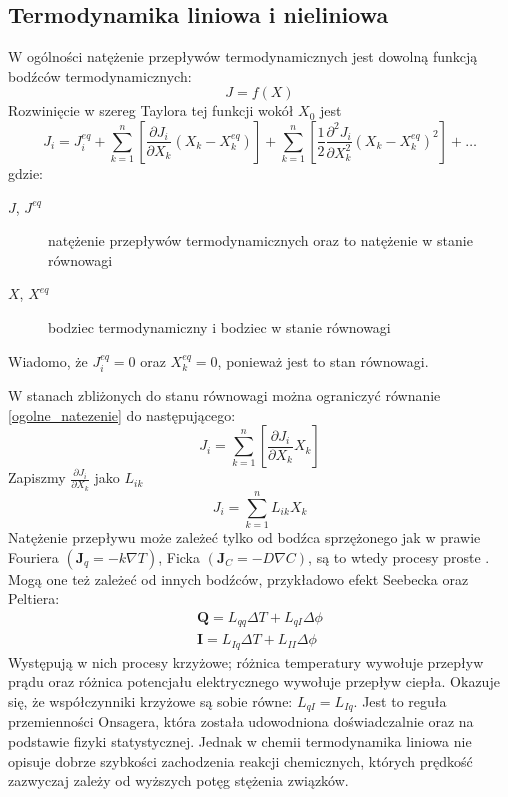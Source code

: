 \documentclass[10pt, a4paper, twoside, onecolumn]{article}
\numberwithin{equation}{section}
\begin{document}
	\subsection{Termodynamika liniowa i nieliniowa}
	W ogólności natężenie przepływów termodynamicznych jest dowolną funkcją bodźców termodynamicznych: 
	\[J=f\left(X\right)\]
	Rozwinięcie w szereg Taylora tej funkcji wokół \(X_{0}\) jest
	\begin{equation}\label{ogolne_natezenie}
		J_{i}=J_{i}^{eq}+\sum_{k=1}^{n}\left[\frac{\partial J_{i}}{\partial X_{k}}\left(X_{k}-X_{k}^{eq}\right)\right]+\sum_{k=1}^{n}\left[\frac{1}{2}\frac{\partial^{2} J_{i}}{\partial X_{k}^{2}}\left(X_{k}-X_{k}^{eq}\right)^{2}\right]+\ldots
	\end{equation} %
	gdzie:
	\begin{description}
		\item[\(J\), \(J^{eq}\)] natężenie przepływów termodynamicznych oraz to natężenie w stanie równowagi
		\item[\(X\), \(X^{eq}\)] bodziec termodynamiczny i bodziec w stanie równowagi
	\end{description}
	Wiadomo, że \(J_{i}^{eq}=0\) oraz \(X_{k}^{eq}=0\), ponieważ jest to stan równowagi. \par
	W stanach zbliżonych do stanu równowagi można ograniczyć równanie \eqref{ogolne_natezenie} do następującego: 
	\begin{equation}\label{natezenie_liniowe}
		J_{i}=\sum_{k=1}^{n}\left[\frac{\partial J_{i}}{\partial X_{k}}X_{k}\right]
	\end{equation}
	Zapiszmy \(\frac{\partial J_{i}}{\partial X_{k}}\) jako \(L_{ik}\)
	\begin{equation}
		J_{i}=\sum_{k=1}^{n}L_{ik}X_{k}
	\end{equation}
	Natężenie przepływu może zależeć tylko od bodźca sprzężonego jak w prawie Fouriera \(\left(\boldsymbol{J}_{q}=-k\nabla T\right)\), Ficka \(\left(\boldsymbol{J}_{C}=-D\nabla C\right)\), są to wtedy procesy proste \cite{orlik}. Mogą one też zależeć od innych bodźców, przykładowo efekt Seebecka oraz Peltiera:
	\begin{gather}
		\boldsymbol{Q}=L_{qq}\Delta T+L_{qI}\Delta \phi \\
		\boldsymbol{I}=L_{Iq}\Delta T+L_{II}\Delta \phi
	\end{gather}\cite{Ceynowa2008}
	Występują w nich procesy krzyżowe; różnica temperatury wywołuje przepływ prądu oraz różnica potencjału elektrycznego wywołuje przepływ ciepła.
	Okazuje się, że współczynniki krzyżowe są sobie równe: \(L_{qI}=L_{Iq}\). Jest to reguła przemienności Onsagera, która została udowodniona doświadczalnie oraz na podstawie fizyki statystycznej. 
	Jednak w chemii termodynamika liniowa nie opisuje dobrze szybkości zachodzenia reakcji chemicznych, których prędkość zazwyczaj zależy od wyższych potęg stężenia związków. \par
	
\end{document}
